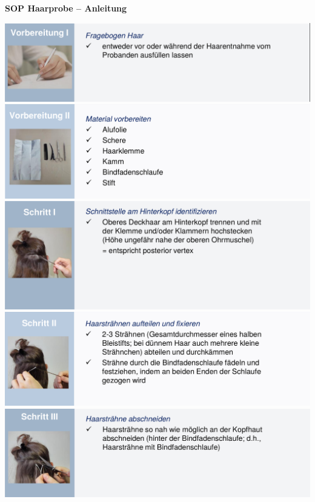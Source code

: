 \begin{center}
{\Large \textbf{SOP Haarprobe -- Anleitung}}
\end{center}
\vspace*{1cm}

\noindent
\includegraphics[width=\textwidth]{./media/SOP_Haarprobe_Entnahme_1.png}
\includegraphics[width=\textwidth]{./media/SOP_Haarprobe_Entnahme_2.png}
\includegraphics[width=\textwidth]{./media/SOP_Haarprobe_Entnahme_3.png}
\includegraphics[width=\textwidth]{./media/SOP_Haarprobe_Entnahme_4.png}
\includegraphics[width=\textwidth]{./media/SOP_Haarprobe_Entnahme_5.png}
